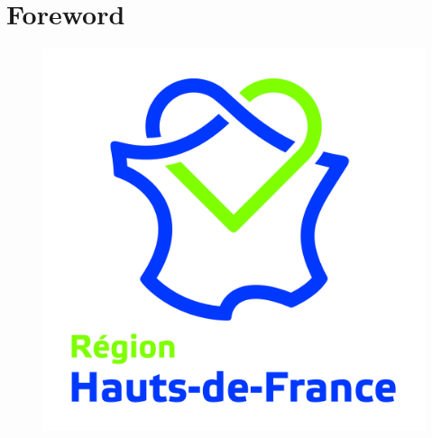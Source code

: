 
\cleardoublepage
\section*{Foreword
    \label{body:avant-propos}
    }

\begin{figure} %
    \vspace{-10pt} %
    \includegraphics[width=\linewidth]{src/Figures/Introduction/Logo_HdF.jpg} 
    \caption*{}
    \label{fig-introduction:logo-hdf}
\end{figure}

